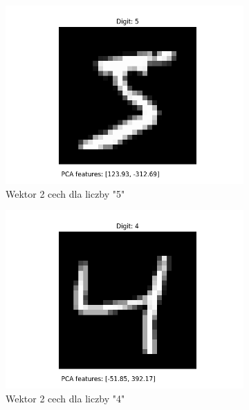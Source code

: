 \documentclass[10pt]{article}
\begin{document}
\begin{figure}[H]\centering
    \begin{subfigure}{0.16\textwidth}
        \includegraphics[width=\linewidth]{img/PCA/PCA_5}
        \caption{Wektor 2 cech dla liczby "5"}
    \end{subfigure}
    \hfill
    \begin{subfigure}{0.16\textwidth}
        \includegraphics[width=\linewidth]{img/PCA/PCA_4}
        \caption{Wektor 2 cech dla liczby "4"}
    \end{subfigure}
    \hfill
    \begin{subfigure}{0.16\textwidth}

\end{subfigure}
\end{figure}
\end{document}
